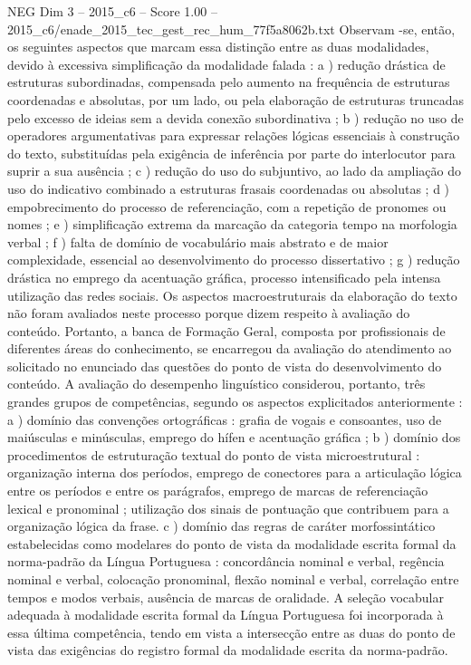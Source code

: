 \begin{textsample}{NEG Dim 3 – 2015\_c6 – Score 1.00 – 2015\_c6/enade\_2015\_tec\_gest\_rec\_hum\_77f5a8062b.txt}
Observam -se, então, os seguintes aspectos que marcam essa distinção entre as duas modalidades, devido à excessiva simplificação da modalidade falada : a ) redução drástica de estruturas subordinadas, compensada pelo aumento na frequência de estruturas coordenadas e absolutas, por um lado, ou pela elaboração de estruturas truncadas pelo excesso de ideias sem a devida conexão subordinativa ; b ) redução no uso de operadores argumentativas para expressar relações lógicas essenciais à construção do texto, substituídas pela exigência de inferência por parte do interlocutor para suprir a sua ausência ; c ) redução do uso do subjuntivo, ao lado da ampliação do uso do indicativo combinado a estruturas frasais coordenadas ou absolutas ; d ) empobrecimento do processo de referenciação, com a repetição de pronomes ou nomes ; e ) simplificação extrema da marcação da categoria tempo na morfologia verbal ; f ) falta de domínio de vocabulário mais abstrato e de maior complexidade, essencial ao desenvolvimento do processo dissertativo ; g ) redução drástica no emprego da acentuação gráfica, processo intensificado pela intensa utilização das redes sociais.
Os aspectos macroestruturais da elaboração do texto não foram avaliados neste processo porque dizem respeito à avaliação do conteúdo.
Portanto, a banca de Formação Geral, composta por profissionais de diferentes áreas do conhecimento, se encarregou da avaliação do atendimento ao solicitado no enunciado das questões do ponto de vista do desenvolvimento do conteúdo.
A avaliação do desempenho linguístico considerou, portanto, três grandes grupos de competências, segundo os aspectos explicitados anteriormente : a ) domínio das convenções ortográficas : grafia de vogais e consoantes, uso de maiúsculas e minúsculas, emprego do hífen e acentuação gráfica ; b ) domínio dos procedimentos de estruturação textual do ponto de vista microestrutural : organização interna dos períodos, emprego de conectores para a articulação lógica entre os períodos e entre os parágrafos, emprego de marcas de referenciação lexical e pronominal ; utilização dos sinais de pontuação que contribuem para a organização lógica da frase. c ) domínio das regras de caráter morfossintático estabelecidas como modelares do ponto de vista da modalidade escrita formal da norma-padrão da Língua Portuguesa : concordância nominal e verbal, regência nominal e verbal, colocação pronominal, flexão nominal e verbal, correlação entre tempos e modos verbais, ausência de marcas de oralidade.
A seleção vocabular adequada à modalidade escrita formal da Língua Portuguesa foi incorporada à essa última competência, tendo em vista a intersecção entre as duas do ponto de vista das exigências do registro formal da modalidade escrita da norma-padrão.

\end{textsample}
